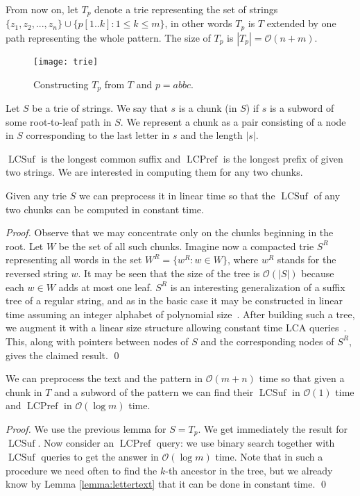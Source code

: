 \documentclass[runningheads]{llncs}
\DeclareMathOperator{\LCPref}{LCPref}
\DeclareMathOperator{\LCSuf}{LCSuf}
\begin{document}
From now on, let $T_p$ denote a trie representing the set of strings $\{z_1, z_2, ..., z_n\}\cup \{p[1..k]:1\leq k\leq m\}$, in other words $T_p$ is $T$ extended by one path representing the whole pattern. The size of $T_p$ is $|T_p|=\mathcal{O}(n+m)$.

\begin{figure}[t]
\centering
\texttt{[image: trie]}
\caption{Constructing $T_p$ from $T$ and $p=abbc$.}
\label{figure:trie_pattern}
\end{figure}


\begin{definition}
Let $S$ be a trie of strings. We say that $s$ is a chunk (in $S$) if $s$ is a subword of some root-to-leaf path in $S$. We represent a chunk as a pair consisting of a node in $S$ corresponding to the last letter in $s$ and the length $|s|$.
\end{definition}

$\LCSuf$ is the longest common suffix and $\LCPref$ is the longest prefix of given two strings. We are interested in computing them for any two chunks.

\begin{lemma}\label{lemma:LCSuf}
Given any trie $S$ we can preprocess it in linear time so that the $\LCSuf$ of any two chunks can be computed in constant time.
\end{lemma}

\begin{proof}
Observe that we may concentrate only on the chunks beginning in the root. Let $W$ be the set of all such chunks. Imagine now a compacted trie $S^R$ representing all words in the set $W^R=\{w^R:w\in W\}$, where $w^R$ stands for the reversed string $w$. It may be seen that the size of the tree is $\mathcal{O}(|S|)$ because each $w\in W$ adds at most one leaf. $S^R$ is an interesting generalization of a suffix tree of a regular string, and as in the basic case it may be constructed in linear time assuming an integer alphabet of polynomial size~\cite{Shibuya99}. After building such a tree, we augment it with a linear size structure allowing constant time LCA queries~\cite{Bender}. This, along with pointers between nodes of $S$ and the corresponding nodes of $S^R$, gives the claimed result.
\qed
\end{proof}

\begin{lemma}\label{lemma:LCPref}
We can preprocess the text and the pattern in $\mathcal{O}(m+n)$ time so that given a chunk in $T$ and a subword of the pattern we can find their $\LCSuf$ in $\mathcal{O}(1)$ time and $\LCPref$ in $\mathcal{O}(\log m)$ time.
\end{lemma}
\begin{proof}
We use the previous lemma for $S=T_p$. We get immediately the result for $\LCSuf$. Now consider an $\LCPref$ query: we use binary search together with $\LCSuf$ queries to get the answer in $\mathcal{O}(\log m)$ time. Note that in such a procedure we need often to find the $k$-th ancestor in the tree, but we already know by Lemma \ref{lemma:lettertext} that it can be done in constant time.
\qed
\end{proof}
\end{document}
